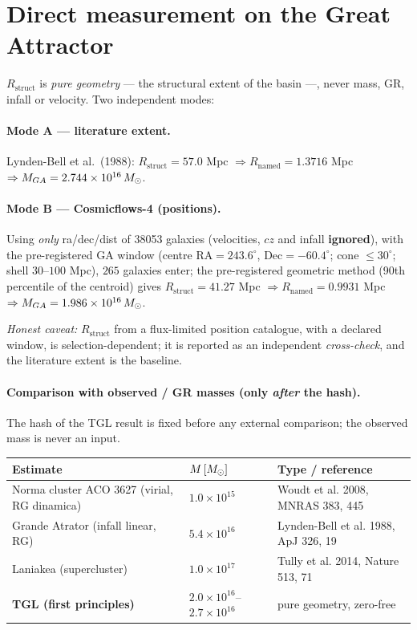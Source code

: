 \documentclass[11pt]{article}
\theoremstyle{definition}\newtheorem{deriv}{Derivation}
\begin{document}
\section{Direct measurement on the Great Attractor}

$R_{\mathrm{struct}}$ is \emph{pure geometry} --- the structural extent of the basin ---, never mass, GR, infall or velocity. Two independent modes:

\paragraph{Mode A --- literature extent.} Lynden-Bell et al.\ (1988): $R_{\mathrm{struct}}=57.0$ Mpc $\Rightarrow R_{\mathrm{named}}=1.3716$ Mpc $\Rightarrow M_{GA}=2.744\times10^{16}\,M_{\odot}$.

\paragraph{Mode B --- Cosmicflows-4 (positions).} Using \emph{only} ra/dec/dist of 38053 galaxies (velocities, $cz$ and infall \textbf{ignored}), with the pre-registered GA window (centre $\mathrm{RA}=243.6^\circ$, $\mathrm{Dec}=-60.4^\circ$; cone $\leq30^\circ$; shell $30$--$100$ Mpc), $265$ galaxies enter; the pre-registered geometric method (90th percentile of the centroid) gives $R_{\mathrm{struct}}=41.27$ Mpc $\Rightarrow R_{\mathrm{named}}=0.9931$ Mpc $\Rightarrow M_{GA}=1.986\times10^{16}\,M_{\odot}$.

\emph{Honest caveat:} $R_{\mathrm{struct}}$ from a flux-limited position catalogue, with a declared window, is selection-dependent; it is reported as an independent \emph{cross-check}, and the literature extent is the baseline.

\paragraph{Comparison with observed / GR masses (only \emph{after} the hash).} The hash of the TGL result is fixed before any external comparison; the observed mass is never an input.

\begin{center}\small\begin{tabular}{p{5.3cm}l p{5.2cm}}\toprule

Estimate & $M\,[M_{\odot}]$ & Type / reference\\\midrule

Norma cluster ACO 3627 (virial, RG dinamica) & $1.0\times10^{15}$ & Woudt et al. 2008, MNRAS 383, 445\\

Grande Atrator (infall linear, RG) & $5.4\times10^{16}$ & Lynden-Bell et al. 1988, ApJ 326, 19\\

Laniakea (supercluster) & $1.0\times10^{17}$ & Tully et al. 2014, Nature 513, 71\\

\textbf{TGL (first principles)} & $2.0\times10^{16}$--$2.7\times10^{16}$ & pure geometry, zero-free\\\bottomrule

\end{tabular}\end{center}
\end{document}
